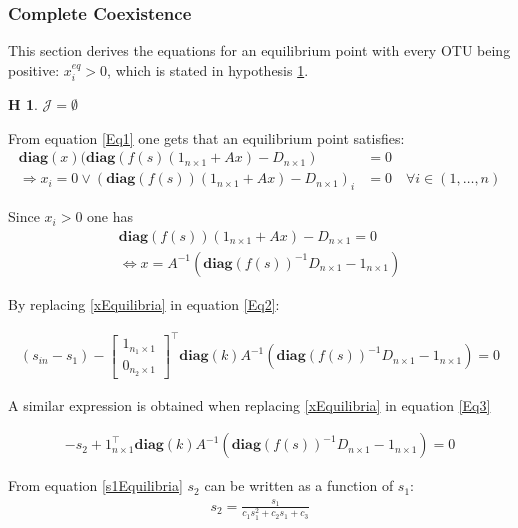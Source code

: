 \documentclass[3p,times]{article}
\newcommand{\diag}{\textbf{diag}}
\newtheorem{hypo}{H}
\begin{document}
\subsubsection{Complete Coexistence}

This section derives the equations for an equilibrium point with every OTU being positive: $x^{eq}_i>0$, which is stated in hypothesis \ref{hypothesis complete coexistence}.

\begin{hypo}
	$\mathcal{J} =  \emptyset$
	\label{hypothesis complete coexistence}
\end{hypo}

From equation \eqref{Eq1} one gets that an equilibrium point satisfies: \begin{align*}
\diag(x)(\diag(f(s)(1_{n\times 1} + Ax) - D_{n\times 1}) & = 0 \\
\Rightarrow x_i = 0 \vee (\diag (f(s))(1_{n\times 1} + Ax) - D_{n\times 1})_i & = 0 \quad \forall i\in (1,\dots,n)
\end{align*}

Since $x_i>0$ one has 
\begin{align}
\diag(f(s))(1_{n\times 1} + Ax) - D_{n\times 1}=0 \\
\label{xEquilibria}\Leftrightarrow x = A^{-1}(\diag (f(s))^{-1}D_{n\times 1} - 1_{n\times 1})
\end{align}  

By replacing \eqref{xEquilibria} in equation \eqref{Eq2}:


\begin{align}
\label{s1Equilibria} (s_{in}-s_1)-	\begin{bmatrix}
1_{n_1\times 1} \\0_{n_2\times 1}
\end{bmatrix}^\top \diag (k) A^{-1}(\diag(f(s))^{-1}D_{n\times 1}-1_{n\times 1}) = 0 
\end{align}


A similar expression is obtained when replacing \eqref{xEquilibria} in equation \eqref{Eq3}

\begin{align}
\label{s2Equilibria}-s_2+
1_{n\times 1}^{\top}\diag (k)  A^{-1}(\diag(f(s))^{-1}D_{n\times 1}-1_{n\times 1}) = 0
\end{align}

From equation \eqref{s1Equilibria} $s_2$ can be written as a function of $s_1$:
\begin{align}
s_2 = \frac{s_1}{c_1s_1^2+c_2s_1+c_3} \label{S2(S1)}
\end{align}
\end{document}
